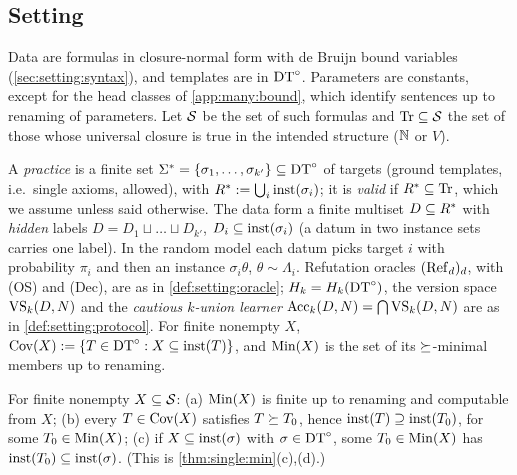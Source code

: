 \subsection{Setting}\label{sec:many:setting}

Data are formulas in closure-normal form with de Bruijn bound variables (\cref{sec:setting:syntax}), and templates are in
$\mathrm{DT}^{\circ}$. Parameters are constants, except for the head classes of \cref{app:many:bound}, which identify sentences up to
renaming of parameters. Let $\mathcal{S}$ be the set of such formulas and $\mathrm{Tr}\subseteq\mathcal{S}$ the
set of those whose universal closure is true in the intended structure ($\mathbb{N}$ or $V$).

\begin{definition}\label{def:many:setting}
A \emph{practice} is a finite set $\Sigma^*=\{\sigma_1,\dots,\sigma_{k'}\}\subseteq\mathrm{DT}^{\circ}$ of targets (ground templates,
i.e.\ single axioms, allowed), with $R^{*}:=\bigcup_i\mathrm{inst}(\sigma_i)$; it is \emph{valid} if
$R^{*}\subseteq\mathrm{Tr}$, which we assume unless said otherwise. The data form a finite multiset $D\subseteq R^{*}$
with \emph{hidden} labels $D=D_1\sqcup\dots\sqcup D_{k'}$, $D_i\subseteq\mathrm{inst}(\sigma_i)$ (a datum in two instance sets
carries one label). In the random model each datum picks target $i$ with probability $\pi_i$ and then an instance
$\sigma_i\theta$, $\theta\sim\Lambda_i$. Refutation oracles $(\mathrm{Ref}_d)_d$, with (OS) and (Dec), are as in
\cref{def:setting:oracle}; $H_{k}=H_{k}(\mathrm{DT}^{\circ})$, the version space $\mathrm{VS}_k(D,N)$ and the \emph{cautious $k$-union
learner} $\mathrm{Acc}_k(D,N)=\bigcap\mathrm{VS}_k(D,N)$ are as in \cref{def:setting:protocol}. For finite nonempty $X$,
$\mathrm{Cov}(X):=\{T\in\mathrm{DT}^{\circ}:X\subseteq\mathrm{inst}(T)\}$, and $\mathrm{Min}(X)$ is the set of its $\succeq$-minimal members up to renaming.
\end{definition}

\begin{proposition}\label{prop:many:W}
For finite nonempty $X\subseteq\mathcal{S}$: (a) $\mathrm{Min}(X)$ is finite up to renaming and computable from $X$; (b) every
$T\in\mathrm{Cov}(X)$ satisfies $T\succeq T_0$, hence $\mathrm{inst}(T)\supseteq\mathrm{inst}(T_0)$, for some $T_0\in\mathrm{Min}(X)$; (c) if
$X\subseteq\mathrm{inst}(\sigma)$ with $\sigma\in\mathrm{DT}^{\circ}$, some $T_0\in\mathrm{Min}(X)$ has $\mathrm{inst}(T_0)\subseteq\mathrm{inst}(\sigma)$. (This is
\cref{thm:single:min}(c),(d).)
\end{proposition}

